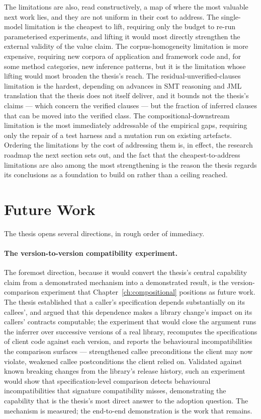 The limitations are also, read constructively, a map of where the most valuable
next work lies, and they are not uniform in their cost to address. The
single-model limitation is the cheapest to lift, requiring only the budget to re-run
parameterised experiments, and lifting it would most directly strengthen the
external validity of the value claim. The corpus-homogeneity limitation is more
expensive, requiring new corpora of application and framework code and, for some
method categories, new inference patterns, but it is the limitation whose lifting
would most broaden the thesis's reach. The residual-unverified-clauses limitation is
the hardest, depending on advances in SMT reasoning and JML translation that the
thesis does not itself deliver, and it bounds not the thesis's claims --- which
concern the verified clauses --- but the fraction of inferred clauses that can be
moved into the verified class. The compositional-downstream limitation is the most
immediately addressable of the empirical gaps, requiring only the repair of a test
harness and a mutation run on existing artefacts. Ordering the limitations by the
cost of addressing them is, in effect, the research roadmap the next section sets
out, and the fact that the cheapest-to-address limitations are also among the most
strengthening is the reason the thesis regards its conclusions as a foundation to
build on rather than a ceiling reached.

\section{Future Work}

The thesis opens several directions, in rough order of immediacy.

\paragraph{The version-to-version compatibility experiment.} The foremost
direction, because it would convert the thesis's central capability claim from a
demonstrated mechanism into a demonstrated result, is the version-comparison
experiment that Chapter~\ref{ch:compositional} positions as future work. The thesis
established that a caller's specification depends substantially on its callees', and
argued that this dependence makes a library change's impact on its callers'
contracts computable; the experiment that would close the argument runs the
inferrer over successive versions of a real library, recomputes the specifications
of client code against each version, and reports the behavioural incompatibilities
the comparison surfaces --- strengthened callee preconditions the client may now
violate, weakened callee postconditions the client relied on. Validated against
known breaking changes from the library's release history, such an experiment would
show that specification-level comparison detects behavioural incompatibilities that
signature compatibility misses, demonstrating the capability that is the thesis's
most direct answer to the adoption question. The mechanism is measured; the
end-to-end demonstration is the work that remains.

